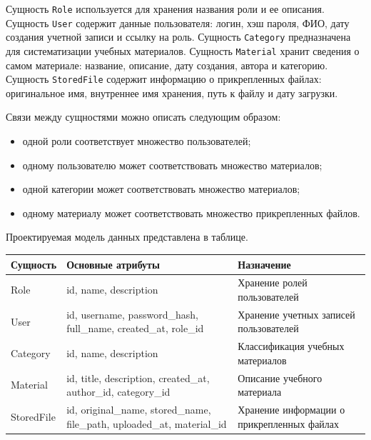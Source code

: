Сущность \texttt{Role} используется для хранения названия роли и ее описания. Сущность \texttt{User} содержит данные пользователя: логин, хэш пароля, ФИО, дату создания учетной записи и ссылку на роль. Сущность \texttt{Category} предназначена для систематизации учебных материалов. Сущность \texttt{Material} хранит сведения о самом материале: название, описание, дату создания, автора и категорию. Сущность \texttt{StoredFile} содержит информацию о прикрепленных файлах: оригинальное имя, внутреннее имя хранения, путь к файлу и дату загрузки.

Связи между сущностями можно описать следующим образом:

\begin{itemize}[leftmargin=1.25cm]
    \item одной роли соответствует множество пользователей;
    \item одному пользователю может соответствовать множество материалов;
    \item одной категории может соответствовать множество материалов;
    \item одному материалу может соответствовать множество прикрепленных файлов.
\end{itemize}

Проектируемая модель данных представлена в таблице.

\begin{center}
\begin{tabularx}{0.96\textwidth}{>{\raggedright\arraybackslash}p{2.9cm} >{\raggedright\arraybackslash}p{4.8cm} >{\raggedright\arraybackslash}X}
\toprule
\textbf{Сущность} & \textbf{Основные атрибуты} & \textbf{Назначение} \\
\midrule
Role & id, name, description & Хранение ролей пользователей \\
User & id, username, password\_hash, full\_name, created\_at, role\_id & Хранение учетных записей пользователей \\
Category & id, name, description & Классификация учебных материалов \\
Material & id, title, description, created\_at, author\_id, category\_id & Описание учебного материала \\
StoredFile & id, original\_name, stored\_name, file\_path, uploaded\_at, material\_id & Хранение информации о прикрепленных файлах \\
\bottomrule
\end{tabularx}
\end{center}


